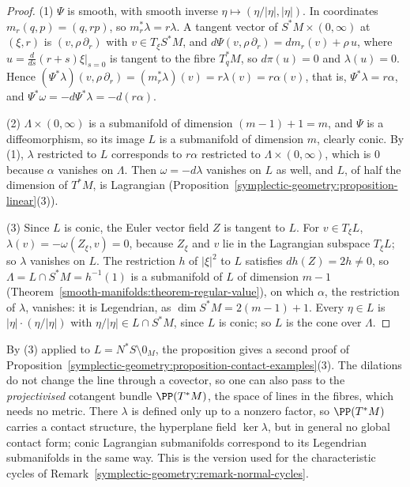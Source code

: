 \begin{proof}
(1) $\Psi$ is smooth, with smooth inverse $\eta \mapsto (\eta/|\eta|, |\eta|)$. In coordinates $m_r(q, p) = (q, rp)$, so $m_r^*\lambda = r\lambda$. A tangent vector of $S^*M \times (0, \infty)$ at $(\xi, r)$ is $(v, \rho\,\partial_r)$ with
$v \in T_\xi S^*M$, and $d\Psi(v, \rho\,\partial_r) = dm_r(v) + \rho\,u$, where $u = \frac{d}{ds}(r + s)\xi|_{s = 0}$ is tangent to the fibre $T^*_qM$, so $d\pi(u) = 0$ and $\lambda(u) = 0$. Hence
$(\Psi^*\lambda)(v, \rho\,\partial_r) = (m_r^*\lambda)(v) = r\lambda(v) = r\alpha(v)$, that is, $\Psi^*\lambda = r\alpha$, and $\Psi^*\omega = -d\Psi^*\lambda = -d(r\alpha)$.

(2) $\Lambda \times (0, \infty)$ is a submanifold of dimension $(m - 1) + 1 = m$, and $\Psi$ is a diffeomorphism, so its image $L$ is a submanifold of dimension $m$, clearly conic. By (1), $\lambda$ restricted to $L$
corresponds to $r\alpha$ restricted to $\Lambda \times (0, \infty)$, which is $0$ because $\alpha$ vanishes on $\Lambda$. Then $\omega = -d\lambda$ vanishes on $L$ as well, and $L$, of half the dimension of $T^*M$, is Lagrangian
(Proposition~\ref{symplectic-geometry:proposition-linear}(3)).

(3) Since $L$ is conic, the Euler vector field $Z$ is tangent to $L$. For $v \in T_\xi L$, $\lambda(v) = -\omega(Z_\xi, v) = 0$, because $Z_\xi$ and $v$ lie in the Lagrangian subspace $T_\xi L$; so $\lambda$ vanishes on $L$. The
restriction $h$ of $|\xi|^2$ to $L$ satisfies $dh(Z) = 2h \neq 0$, so $\Lambda = L \cap S^*M = h^{-1}(1)$ is a submanifold of $L$ of dimension $m - 1$ (Theorem~\ref{smooth-manifolds:theorem-regular-value}), on which $\alpha$, the
restriction of $\lambda$, vanishes: it is Legendrian, as $\dim S^*M = 2(m - 1) + 1$. Every $\eta \in L$ is $|\eta| \cdot (\eta/|\eta|)$ with $\eta/|\eta| \in L \cap S^*M$, since $L$ is conic; so $L$ is the cone over $\Lambda$.
\end{proof}

By (3) applied to $L = N^*S \setminus 0_M$, the proposition gives a second proof of Proposition~\ref{symplectic-geometry:proposition-contact-examples}(3). The dilations do not change the line through a covector, so one
can also pass to the \emph{projectivised} cotangent bundle $\PP(T^*M)$, the space of lines in the fibres, which needs no metric. There $\lambda$ is defined only up to a nonzero factor, so $\PP(T^*M)$ carries a contact
structure, the hyperplane field $\ker\lambda$, but in general no global contact form; conic Lagrangian submanifolds correspond to its Legendrian submanifolds in the same way. This is the version used for
the characteristic cycles of Remark~\ref{symplectic-geometry:remark-normal-cycles}.

